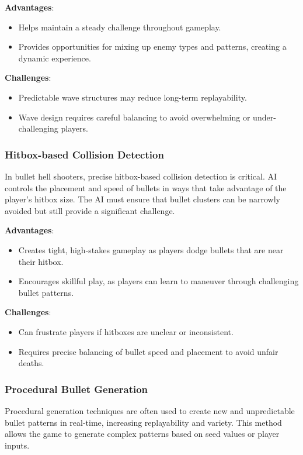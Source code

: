 \textbf{Advantages}:
\begin{itemize}
    \item Helps maintain a steady challenge throughout gameplay.
    \item Provides opportunities for mixing up enemy types and patterns, creating a dynamic experience.
\end{itemize}

\textbf{Challenges}:
\begin{itemize}
    \item Predictable wave structures may reduce long-term replayability.
    \item Wave design requires careful balancing to avoid overwhelming or under-challenging players.
\end{itemize}

\subsubsection{Hitbox-based Collision Detection}

In bullet hell shooters, precise hitbox-based collision detection is critical. AI controls the placement and speed of bullets in ways that take advantage of the player’s hitbox size. The AI must ensure that bullet clusters can be narrowly avoided but still provide a significant challenge.

\textbf{Advantages}:
\begin{itemize}
    \item Creates tight, high-stakes gameplay as players dodge bullets that are near their hitbox.
    \item Encourages skillful play, as players can learn to maneuver through challenging bullet patterns.
\end{itemize}

\textbf{Challenges}:
\begin{itemize}
    \item Can frustrate players if hitboxes are unclear or inconsistent.
    \item Requires precise balancing of bullet speed and placement to avoid unfair deaths.
\end{itemize}

\subsubsection{Procedural Bullet Generation}

Procedural generation techniques are often used to create new and unpredictable bullet patterns in real-time, increasing replayability and variety. This method allows the game to generate complex patterns based on seed values or player inputs.

